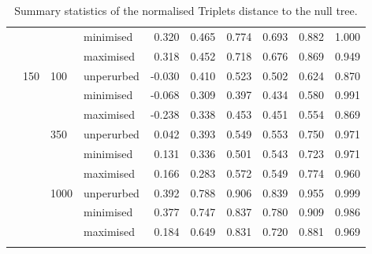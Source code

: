 \begin{longtable}{llllrrrrrr}
   &  &  & minimised & 0.320 & 0.465 & 0.774 & 0.693 & 0.882 & 1.000 \\ 
   &  &  & maximised & 0.318 & 0.452 & 0.718 & 0.676 & 0.869 & 0.949 \\ 
   & 150 & 100 & unperurbed & -0.030 & 0.410 & 0.523 & 0.502 & 0.624 & 0.870 \\ 
   &  &  & minimised & -0.068 & 0.309 & 0.397 & 0.434 & 0.580 & 0.991 \\ 
   &  &  & maximised & -0.238 & 0.338 & 0.453 & 0.451 & 0.554 & 0.869 \\ 
   &  & 350 & unperurbed & 0.042 & 0.393 & 0.549 & 0.553 & 0.750 & 0.971 \\ 
   &  &  & minimised & 0.131 & 0.336 & 0.501 & 0.543 & 0.723 & 0.971 \\ 
   &  &  & maximised & 0.166 & 0.283 & 0.572 & 0.549 & 0.774 & 0.960 \\ 
   &  & 1000 & unperurbed & 0.392 & 0.788 & 0.906 & 0.839 & 0.955 & 0.999 \\ 
   &  &  & minimised & 0.377 & 0.747 & 0.837 & 0.780 & 0.909 & 0.986 \\ 
   &  &  & maximised & 0.184 & 0.649 & 0.831 & 0.720 & 0.881 & 0.969 \\ 
   \hline
\hline
\caption{Summary statistics of the normalised Triplets distance to the null tree.} 
\label{Full_Tab_SummaryTrnull}
\end{longtable}
